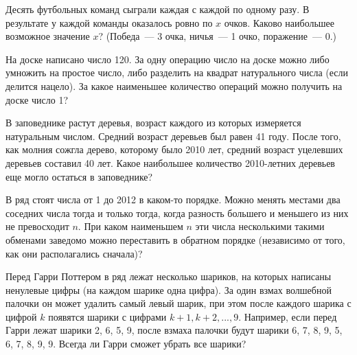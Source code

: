 \documentclass[14pt,DIV14]{scrartcl}
\begin{document}

\begin{task}
Десять футбольных команд сыграли каждая с каждой по одному разу. В результате у каждой команды оказалось ровно по $x$  очков. Каково наибольшее возможное значение $x$? (Победа~--- 3 очка, ничья~--- 1 очко, поражение~--- 0.)
\end{task}

\begin{task}
На доске написано число 120. За одну операцию число на доске можно либо умножить на простое число, либо разделить на квадрат натурального числа (если делится нацело). За какое наименьшее количество операций можно получить на доске число 1?
\end{task}

\begin{task}
В заповеднике растут деревья, возраст каждого из которых измеряется натуральным числом. Средний возраст деревьев был равен 41 году. После того, как молния сожгла дерево, которому было 2010 лет, средний возраст уцелевших деревьев составил 40 лет. Какое наибольшее количество 2010-летних деревьев еще могло остаться в заповеднике?
\end{task}

\begin{task}
В ряд стоят числа от 1 до 2012 в каком-то порядке. Можно менять местами два соседних числа тогда и только тогда, когда разность большего и меньшего из них не превосходит $n$. При каком наименьшем $n$ эти числа несколькими такими обменами заведомо можно переставить в обратном порядке (независимо от того, как они располагались сначала)?
\end{task}

\begin{task}
Перед Гарри Поттером в ряд лежат несколько шариков, на которых написаны ненулевые цифры (на каждом шарике одна цифра). За один взмах волшебной палочки он может удалить самый левый шарик, при этом после каждого шарика с цифрой $k$ появятся шарики с цифрами $k+1, k+2, ..., 9$. Например, если перед Гарри лежат шарики 2, 6, 5, 9, после взмаха палочки будут шарики 6, 7, 8, 9, 5, 6, 7, 8, 9, 9. Всегда ли Гарри сможет убрать все шарики?
\end{task}
\end{document}
